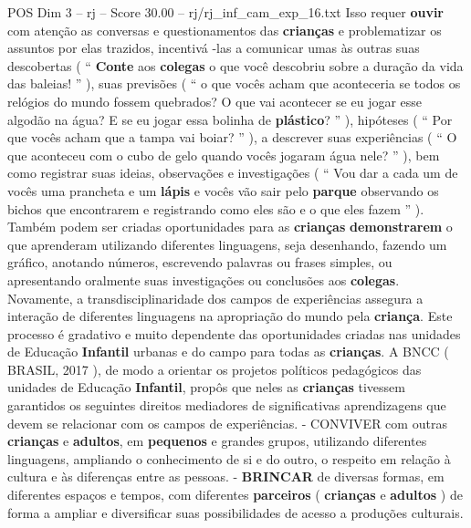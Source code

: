 \begin{textsample}{POS Dim 3 – rj – Score 30.00 – rj/rj\_inf\_cam\_exp\_16.txt}
Isso requer \textbf{ouvir} com atenção as conversas e questionamentos das \textbf{crianças} e problematizar os assuntos por elas trazidos, incentivá -las a comunicar umas às outras suas descobertas ( “ \textbf{Conte} aos \textbf{colegas} o que você descobriu sobre a duração da vida das baleias! ” ), suas previsões ( “ o que vocês acham que aconteceria se todos os relógios do mundo fossem quebrados?
O que vai acontecer se eu jogar esse algodão na água?
E se eu jogar essa bolinha de \textbf{plástico}? ” ), hipóteses ( “ Por que vocês acham que a tampa vai boiar? ” ), a descrever suas experiências ( “ O que aconteceu com o cubo de gelo quando vocês jogaram água nele? ” ), bem como registrar suas ideias, observações e investigações ( “ Vou dar a cada um de vocês uma prancheta e um \textbf{lápis} e vocês vão sair pelo \textbf{parque} observando os bichos que encontrarem e registrando como eles são e o que eles fazem ” ).
Também podem ser criadas oportunidades para as \textbf{crianças} \textbf{demonstrarem} o que aprenderam utilizando diferentes linguagens, seja desenhando, fazendo um gráfico, anotando números, escrevendo palavras ou frases simples, ou apresentando oralmente suas investigações ou conclusões aos \textbf{colegas}.
Novamente, a transdisciplinaridade dos campos de experiências assegura a interação de diferentes linguagens na apropriação do mundo pela \textbf{criança}.
Este processo é gradativo e muito dependente das oportunidades criadas nas unidades de Educação \textbf{Infantil} urbanas e do campo para todas as \textbf{crianças}.
A BNCC ( BRASIL, 2017 ), de modo a orientar os projetos políticos pedagógicos das unidades de Educação \textbf{Infantil}, propôs que neles as \textbf{crianças} tivessem garantidos os seguintes direitos mediadores de significativas aprendizagens que devem se relacionar com os campos de experiências. - CONVIVER com outras \textbf{crianças} e \textbf{adultos}, em \textbf{pequenos} e grandes grupos, utilizando diferentes linguagens, ampliando o conhecimento de si e do outro, o respeito em relação à cultura e às diferenças entre as pessoas. - \textbf{BRINCAR} de diversas formas, em diferentes espaços e tempos, com diferentes \textbf{parceiros} ( \textbf{crianças} e \textbf{adultos} ) de forma a ampliar e diversificar suas possibilidades de acesso a produções culturais.

\end{textsample}
